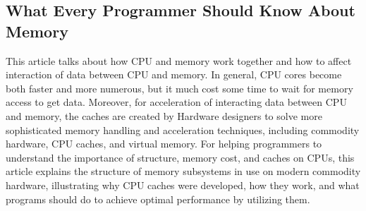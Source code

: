 \documentclass[letterpaper, onecolumn, 10pt]{IEEEtran}
\begin{document}
\subsection*{What Every Programmer Should Know About Memory}
\noindent This article talks about how CPU and memory work together and how to affect interaction of data between CPU and memory. In general, CPU cores become both faster and more numerous, but it much cost some time to wait for memory access to get data. Moreover, for acceleration of interacting data between CPU and memory, the caches are created by Hardware designers to solve more sophisticated memory handling and acceleration techniques, including commodity hardware, CPU caches, and virtual memory. For helping programmers to understand the importance of structure, memory cost, and caches on CPUs, this article explains the structure of memory subsystems in use on modern commodity hardware, illustrating why CPU caches were developed, how they work, and what programs should do to achieve optimal performance by utilizing them.
\end{document}
